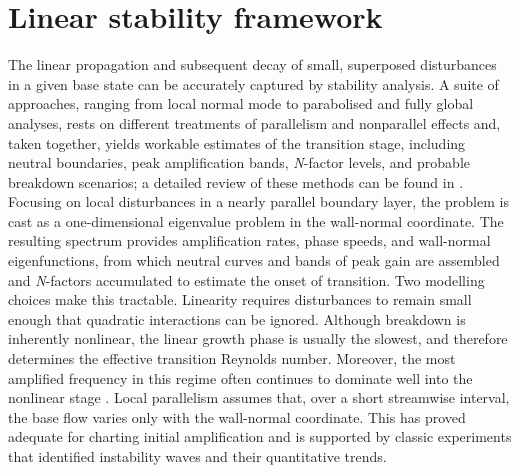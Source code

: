 \section{Linear stability framework}

The linear propagation and subsequent decay of small, superposed disturbances in a given base state can be accurately captured by stability analysis. A suite of approaches, ranging from local normal mode to parabolised and fully global analyses, rests on different treatments of parallelism and nonparallel effects and, taken together, yields workable estimates of the transition stage, including neutral boundaries, peak amplification bands, \textit{N}-factor levels, and probable breakdown scenarios; a detailed review of these methods can be found in \citep{Theofilis2011}. Focusing on local disturbances in a nearly parallel boundary layer, the problem is cast as a one-dimensional eigenvalue problem in the wall-normal coordinate. The resulting spectrum provides amplification rates, phase speeds, and wall-normal eigenfunctions, from which neutral curves and bands of peak gain are assembled and \textit{N}-factors accumulated to estimate the onset of transition. Two modelling choices make this tractable. Linearity requires disturbances to remain small enough that quadratic interactions can be ignored. Although breakdown is inherently nonlinear, the linear growth phase is usually the slowest, and therefore determines the effective transition Reynolds number. Moreover, the most amplified frequency in this regime often continues to dominate well into the nonlinear stage \citep{Reshotko2001,Mack1984}. Local parallelism assumes that, over a short streamwise interval, the base flow varies only with the wall-normal coordinate. This has proved adequate for charting initial amplification and is supported by classic experiments that identified instability waves and their quantitative trends.

